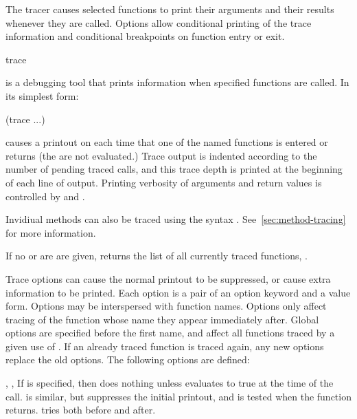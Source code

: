 The tracer causes selected functions to print their arguments and
their results whenever they are called.  Options allow conditional
printing of the trace information and conditional breakpoints on
function entry or exit.

\begin{defmac}{}{trace}{%
    }
  
   is a debugging tool that prints information when
  specified functions are called.  In its simplest form:
  \begin{example}
    (trace   ...)
  \end{example}
   causes a printout on  each time
  that one of the named functions is entered or returns (the
   are not evaluated.)  Trace output is indented according
  to the number of pending traced calls, and this trace depth is
  printed at the beginning of each line of output.  Printing verbosity
  of arguments and return values is controlled by
   and .
  
  Invidiual methods can also be traced using the syntax .
  See~\ref{sec:method-tracing} for more information.

  If no  or  are are given, 
  returns the list of all currently traced functions,
  .
  
  Trace options can cause the normal printout to be suppressed, or
  cause extra information to be printed.  Each option is a pair of an
  option keyword and a value form.  Options may be interspersed with
  function names.  Options only affect tracing of the function whose
  name they appear immediately after.  Global options are specified
  before the first name, and affect all functions traced by a given
  use of .  If an already traced function is traced again,
  any new options replace the old options.  The following options are
  defined:
  \begin{Lentry}
  \item[\kwd{condition} \var{form}, \kwd{condition-after} \var{form},
    \kwd{condition-all} \var{form}] If  is specified,
    then  does nothing unless  evaluates to true
    at the time of the call.   is similar, but
    suppresses the initial printout, and is tested when the function
    returns.   tries both before and after.
    

\end{Lentry}
\end{defmac}
